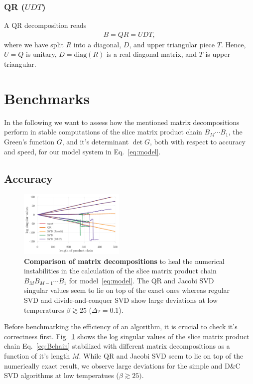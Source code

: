 \documentclass[%
 reprint,
superscriptaddress,
showpacs,
 amsmath,amssymb,
 aps,
 prb,
longbibliography,
]{revtex4-1}
\begin{document}
\subsubsection{QR ($UDT$)}
A QR decomposition reads
\begin{align}
B = QR = UDT,
\end{align}
where we have split $R$ into a diagonal, $D$, and upper triangular piece $T$. Hence, $U = Q$ is unitary, $D = \textrm{diag}(R)$ is a real diagonal matrix, and $T$ is upper triangular.

\section{Benchmarks}

In the following we want to assess how the mentioned matrix decompositions perform in stable computations of the slice matrix product chain $B_M \cdots B_1$, the Green's function $G$, and it's determinant $\det G$, both with respect to accuracy and speed, for our model system in Eq.~\ref{eq:model}.

\subsection{Accuracy}

\begin{figure}
	\includegraphics[width=0.45\textwidth]{../notebooks/decomp_comparison_simple.pdf}
	\caption{\textbf{Comparison of matrix decompositions} to heal the numerical instabilities in the calculation of the slice matrix product chain $B_M B_{M-1} \cdots B_1$ for model~\eqref{eq:model}. The QR and Jacobi SVD singular values seem to lie on top of the exact ones whereas regular SVD and divide-and-conquer SVD show large deviations at low temperatures $\beta \gtrsim 25$ ($\Delta \tau = 0.1$). \label{fig:decomp_comparison_simple}}
\end{figure}

Before benchmarking the efficiency of an algorithm, it is crucial to check it's correctness first. Fig.~\ref{fig:decomp_comparison_simple} shows the log singular values of the slice matrix product chain Eq.~\ref{eq:Bchain} stabilized with different matrix decompositions as a function of it's length $M$. While QR and Jacobi SVD seem to lie on top of the numerically exact result, we observe large deviations for the simple and D\&C SVD algorithms at low temperatues ($\beta \gtrsim 25)$.
\end{document}
